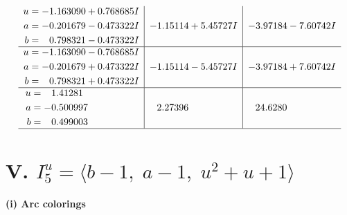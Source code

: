 \documentclass[1p]{elsarticle_modified}
\theoremstyle{definition}
\begin{document}
$$\begin{array}{c|c|c}
\begin{aligned}
u &= -1.163090 + 0.768685 I \\
a &= -0.201679 - 0.473322 I \\
b &= \phantom{-}0.798321 - 0.473322 I\end{aligned}
 & -1.15114 + 5.45727 I & -3.97184 - 7.60742 I \\ \hline\begin{aligned}
u &= -1.163090 - 0.768685 I \\
a &= -0.201679 + 0.473322 I \\
b &= \phantom{-}0.798321 + 0.473322 I\end{aligned}
 & -1.15114 - 5.45727 I & -3.97184 + 7.60742 I \\ \hline\begin{aligned}
u &= \phantom{-}1.41281\phantom{ +0.000000I} \\
a &= -0.500997\phantom{ +0.000000I} \\
b &= \phantom{-}0.499003\phantom{ +0.000000I}\end{aligned}
 & \phantom{-}2.27396\phantom{ +0.000000I} & \phantom{-}24.6280\phantom{ +0.000000I}\\
 \hline 
 \end{array}$$\newpage\newpage\renewcommand{\arraystretch}{1}
\centering \section*{V. $I^u_{5}= \langle b-1,\;a-1,\;u^2+u+1 \rangle$}
\flushleft \textbf{(i) Arc colorings}\\
\end{document}
